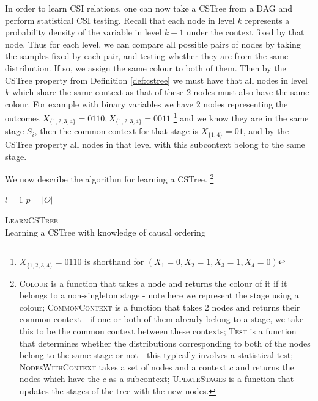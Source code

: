 \documentclass{tufte-book}
\begin{document}
In order to learn CSI relations, one can now take a CSTree from a DAG and perform statistical CSI testing. Recall that each node in level \(k\) represents a probability density of the variable in level \(k+1\) under the context fixed by that node. Thus for each level, we can compare all possible pairs of nodes by taking the samples fixed by each pair, and testing whether they are from the same distribution. If so, we assign the same colour to both of them. Then by the CSTree property from Definition \ref{def:cstree} we must have that all nodes in level \(k\) which share the same context as that of these 2 nodes must also have the same colour. For example with binary variables we have 2 nodes representing the outcomes \(X_{\{1,2,3,4\}}=0110, X_{\{1,2,3,4\}}=0011\)  \footnote{$X_{\{1,2,3,4\}}=0110$ is shorthand for $(X_1=0, X_2=1, X_3=1,X_4=0)$}   and we know they are in the same stage \(S_i\), then the common context for that stage is \(X_{\{1,4\}}=01\), and by the CSTree property all nodes in that level with this subcontext belong to the same stage. 


 \newpage 
We now describe the algorithm for learning a CSTree.  \footnote{\textsc{Colour} is a function that takes a node and returns the colour of it if it belongs to a non-singleton stage - note here we represent the stage using a colour; \textsc{CommonContext} is a function that takes 2 nodes and returns their common context - if one or both of them already belong to a stage, we take this to be the common context between these contexts; \textsc{Test} is a function that determines whether the distributions corresponding to both of the nodes belong to the same stage or not - this typically involves a statistical test; \textsc{NodesWithContext} takes a set of nodes and a context $c$ and returns the nodes which have the $c$ as a subcontext; \textsc{UpdateStages} is a function that updates the stages of the tree with the new nodes.} 

\begin{algorithm}[H]\label{alg:learncstree}
\SetAlgoLined
{}
$l=1$\;
$p=|O|$\;
\caption{\textsc{LearnCSTree} \\ Learning a CSTree with knowledge of causal ordering}
\end{algorithm}
\end{document}
